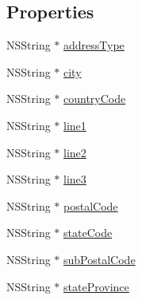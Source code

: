 \subsection*{Properties}
\begin{DoxyCompactItemize}
\item 
N\-S\-String $\ast$ \hyperlink{interface_address_a1dfe784ca902520df620eff595d9c508}{address\-Type}
\item 
N\-S\-String $\ast$ \hyperlink{interface_address_ad47d0a1fe7c82b2c247f33cd745380df}{city}
\item 
N\-S\-String $\ast$ \hyperlink{interface_address_a8f80be382f87d243579dcb31c8ae1d09}{country\-Code}
\item 
N\-S\-String $\ast$ \hyperlink{interface_address_aa8393bdb98aa8a6f9abd997e12acdecd}{line1}
\item 
N\-S\-String $\ast$ \hyperlink{interface_address_a9c46d3e585f0b05031b7b48a3755037b}{line2}
\item 
N\-S\-String $\ast$ \hyperlink{interface_address_adb8395d68afe00ae8bd72871c5d6e3fa}{line3}
\item 
N\-S\-String $\ast$ \hyperlink{interface_address_aa8e603be41326e86b6a15edff1b1588c}{postal\-Code}
\item 
N\-S\-String $\ast$ \hyperlink{interface_address_abc54f84b280bc9ab6e8017f2bd62610b}{state\-Code}
\item 
N\-S\-String $\ast$ \hyperlink{interface_address_a93d53fa65fc90ec08e491c2d285f10e8}{sub\-Postal\-Code}
\item 
N\-S\-String $\ast$ \hyperlink{interface_address_a1cf0af3f0d1124b3d85935e756f5d4fd}{state\-Province}
\end{DoxyCompactItemize}



